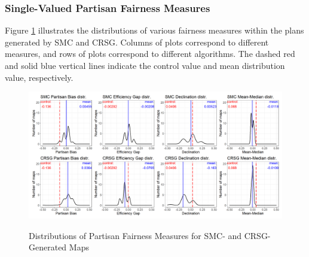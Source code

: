\subsubsection{Single-Valued Partisan Fairness Measures}

Figure \ref{fig:fair.density} illustrates the distributions of various fairness measures within the plans generated by SMC and CRSG. Columns of plots correspond to different measures, and rows of plots correspond to different algorithms. The dashed red and solid blue vertical lines indicate the control value and mean distribution value, respectively. 

\begin{landscape}
    \begin{figure}[h]
        \caption{Distributions of Partisan Fairness Measures for SMC- and CRSG-Generated Maps}
        \includegraphics{img/fair.density.png}
        \label{fig:fair.density}
        \raggedright
    \end{figure}
\end{landscape}